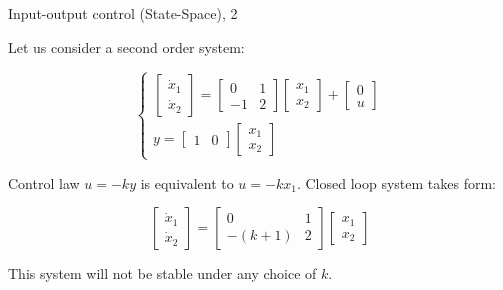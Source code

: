 \documentclass{beamer}
\begin{document}
\begin{frame}{Input-output control (State-Space), 2}
	\begin{flushleft}
		
		\begin{example}
			Let us consider a second order system:
			
			\begin{equation}
				\begin{cases}
					\begin{bmatrix}
						\dot x_1 \\ \dot x_2
					\end{bmatrix} = 
					\begin{bmatrix}
						0 & 1 \\
						-1 & 2
					\end{bmatrix}
					\begin{bmatrix}
						x_1 \\ x_2
					\end{bmatrix}
					+
					\begin{bmatrix}
						0 \\ u
					\end{bmatrix}
					\\
					y = \begin{bmatrix}		1 & 0	\end{bmatrix} 
					\begin{bmatrix}
						x_1 \\ x_2
					\end{bmatrix}
				\end{cases}
			\end{equation}
			
			Control law $u = -k y$ is equivalent to $u = -k x_1$. Closed loop system takes form:
			
			\begin{equation}
				\begin{bmatrix}
					\dot x_1 \\ \dot x_2
				\end{bmatrix} = 
				\begin{bmatrix}
					0 & 1 \\
					-(k+1) & 2
				\end{bmatrix}
				\begin{bmatrix}
					x_1 \\ x_2
				\end{bmatrix}
			\end{equation}
			
			This system will not be stable under any choice of $k$.
		\end{example}
		
		
	\end{flushleft}
\end{frame}
\end{document}
